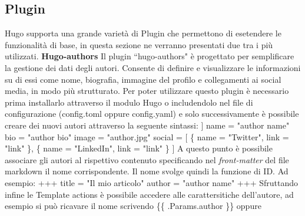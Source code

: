 \documentclass[target=bach,aauheader=]{thud}
\begin{document}
\subsection{Plugin}
Hugo supporta una grande varietà di Plugin che permettono di esetendere le funzionalità di base, in questa sezione ne verranno presentati due tra i più utilizzati.
\newline 
\newline 
\textbf{{\fontsize{12}{14}\selectfont Hugo-authors}}
\newline \newline
Il plugin ``hugo-authors" è progettato per semplificare la gestione dei dati degli autori. Consente di definire e visualizzare le informazioni su di essi come nome, biografia, immagine del profilo e collegamenti ai social media, in modo più strutturato.
\newline
Per poter utilizzare questo plugin è necessario prima installarlo attraverso il modulo Hugo o includendolo nel file di configurazione (config.toml oppure config.yaml) e solo successivamente è possibile creare dei nuovi autori attraverso la seguente sintassi:
\newline \newline
[author]
\newline
[[author.authors]]
\newline
name = "author name"
\newline 
bio = "author bio"
\newline 
image = "author.jpg"
\newline
social = [
\newline
\qquad    \{ name = "Twitter", link = "link" \},
\newline
\qquad    \{ name = "LinkedIn", link = "link" \}
\newline
]
\newline \newline
A questo punto è possibile associare gli autori al rispettivo contenuto specificando nel \textit{front-matter} del file markdown il nome corrispondente. Il nome svolge quindi la funzione di ID. Ad esempio:
\newline \newline
+++
\newline title = "Il mio articolo"
\newline author = "author name"
\newline 
+++
\newline \newline
Sfruttando infine le Template actions è possibile accedere alle carattersitiche dell'autore, ad esempio si può ricavare il nome scrivendo \{\{ .Params.author \}\} oppure 
\end{document}
